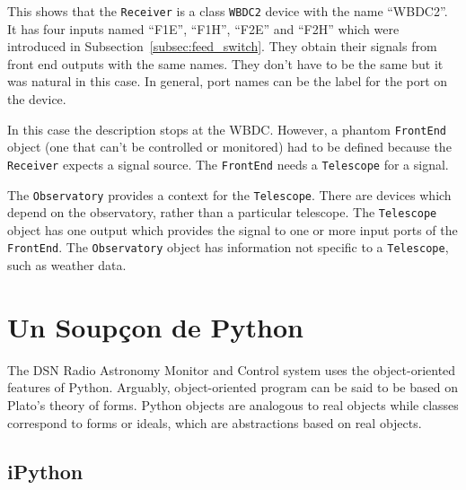 \documentclass[letterpaper,11pt]{book}
\begin{document}
This shows that the {\tt Receiver} is a class {\tt WBDC2} device with the name
``WBDC2''.  It has four inputs named ``F1E'', ``F1H'', ``F2E'' and
``F2H'' which were introduced in Subsection~\ref{subsec:feed_switch}. They
obtain their signals from front end outputs with the same names.  They
don't have to be the same but it was natural in this case.  In general, port
names can be the label for the port on the device.

In this case the description stops at the WBDC.  However, a phantom 
{\tt FrontEnd} object (one that can't be controlled or monitored) had to be 
defined because the {\tt Receiver} expects a signal source.  The 
{\tt FrontEnd} needs a {\tt Telescope} for a signal.

The {\tt Observatory} provides a context for the {\tt Telescope}.  There are
devices which depend on the observatory, rather than a particular telescope.
The {\tt Telescope} object has one output which provides the signal to one or
more input ports of the {\tt FrontEnd}.  The {\tt Observatory} object has
information not specific to a {\tt Telescope}, such as weather data.


\appendix

\chapter{Un Soup\c{c}on de Python}\label{Python}

The DSN Radio Astronomy Monitor and Control system uses the object-oriented
features of Python.  Arguably, object-oriented program can be said to be based
on Plato's theory of forms.  Python objects are analogous to real objects
while classes correspond to forms or ideals, which are abstractions based on
real objects.

\section{iPython}
\end{document}
